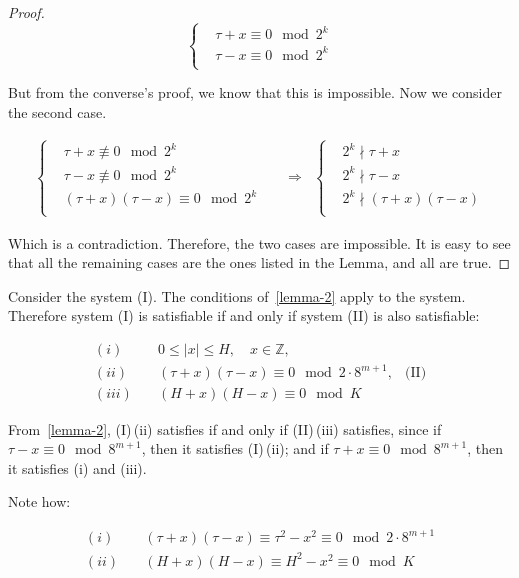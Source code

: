 \documentclass{amsart}
\theoremstyle{plain}
\renewcommand{\implies}{\Rightarrow}
\begin{document}
\begin{proof}
  \begin{equation*}
    \begin{cases}
      &\tau+x\equiv 0\mod 2^k\\
      &\tau-x\equiv 0\mod 2^k\\
    \end{cases}
  \end{equation*}

  But from the converse's proof, we know that this is impossible. Now we consider the second case.

  \begin{align*}
    \begin{cases}
      &\tau+x\not\equiv 0\mod 2^k\\
      &\tau-x\not\equiv 0\mod 2^k\\
      &(\tau+x)(\tau-x)\equiv 0\mod 2^k\\
    \end{cases}\quad&\implies&
    \begin{cases}
      &2^k\nmid\tau+x\\
      &2^k\nmid\tau-x\\
      &2^k\nmid(\tau+x)(\tau-x)\\
    \end{cases}
  \end{align*}

  Which is a contradiction. Therefore, the two cases are impossible. It is easy to see that all the
  remaining cases are the ones listed in the Lemma, and all are true.
\end{proof}

Consider the system (I). The conditions of~\autoref{lemma-2} apply to the system. Therefore system
(I) is satisfiable if and only if system (II) is also satisfiable:

\begin{align*}
  (i) \quad &0\leq|x|\leq H, \quad x\in\mathbb{Z},\\
  (ii) \quad &(\tau+x)(\tau-x)\equiv 0\mod 2\cdot 8^{m+1}, &\text{(II)}\\
  (iii) \quad &(H+x)(H-x)\equiv 0\mod K
\end{align*}

From~\autoref{lemma-2}, (I)\,(ii) satisfies if and only if (II)\,(iii) satisfies, since if $\tau-x
\equiv 0\mod 8^{m+1}$, then it satisfies (I)\,(ii); and if $\tau+x\equiv 0\mod 8^{m+1}$, then it
satisfies (i) and (iii).

Note how:

\begin{align*}
  (i) \quad &(\tau+x)(\tau-x)\equiv\tau^2-x^2\equiv 0\mod 2\cdot 8^{m+1}\\
  (ii) \quad &(H+x)(H-x)\equiv H^2-x^2\equiv 0\mod K
\end{align*}
\end{document}
